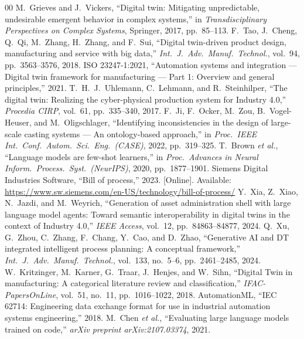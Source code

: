 \documentclass[conference]{IEEEtran}
\begin{document}

\begin{thebibliography}{00}
 M.~Grieves and J.~Vickers, ``Digital twin: Mitigating unpredictable, undesirable emergent behavior in complex systems,'' in \textit{Transdisciplinary Perspectives on Complex Systems}, Springer, 2017, pp.~85--113.
 F.~Tao, J.~Cheng, Q.~Qi, M.~Zhang, H.~Zhang, and F.~Sui, ``Digital twin-driven product design, manufacturing and service with big data,'' \textit{Int.\ J.\ Adv.\ Manuf.\ Technol.}, vol.~94, pp.~3563--3576, 2018.
 ISO 23247-1:2021, ``Automation systems and integration --- Digital twin framework for manufacturing --- Part 1: Overview and general principles,'' 2021.
 T.~H.~J.~Uhlemann, C.~Lehmann, and R.~Steinhilper, ``The digital twin: Realizing the cyber-physical production system for Industry 4.0,'' \textit{Procedia CIRP}, vol.~61, pp.~335--340, 2017.
 F.~Ji, F.~Ocker, M.~Zou, B.~Vogel-Heuser, and M.~Oligschlager, ``Identifying inconsistencies in the design of large-scale casting systems --- An ontology-based approach,'' in \textit{Proc.\ IEEE Int.\ Conf.\ Autom.\ Sci.\ Eng.\ (CASE)}, 2022, pp.~319--325.
 T.~Brown \textit{et al.}, ``Language models are few-shot learners,'' in \textit{Proc.\ Advances in Neural Inform.\ Process.\ Syst.\ (NeurIPS)}, 2020, pp.~1877--1901.
 Siemens Digital Industries Software, ``Bill of process,'' 2023. [Online]. Available: \url{https://www.sw.siemens.com/en-US/technology/bill-of-process/}
 Y.~Xia, Z.~Xiao, N.~Jazdi, and M.~Weyrich, ``Generation of asset administration shell with large language model agents: Toward semantic interoperability in digital twins in the context of Industry 4.0,'' \textit{IEEE Access}, vol.~12, pp.~84863--84877, 2024.
 Q.~Xu, G.~Zhou, C.~Zhang, F.~Chang, Y.~Cao, and D.~Zhao, ``Generative AI and DT integrated intelligent process planning: A conceptual framework,'' \textit{Int.\ J.\ Adv.\ Manuf.\ Technol.}, vol.~133, no.~5--6, pp.~2461--2485, 2024.
 W.~Kritzinger, M.~Karner, G.~Traar, J.~Henjes, and W.~Sihn, ``Digital Twin in manufacturing: A categorical literature review and classification,'' \textit{IFAC-PapersOnLine}, vol.~51, no.~11, pp.~1016--1022, 2018.
 AutomationML, ``IEC 62714: Engineering data exchange format for use in industrial automation systems engineering,'' 2018.
 M.~Chen \textit{et al.}, ``Evaluating large language models trained on code,'' \textit{arXiv preprint arXiv:2107.03374}, 2021.

\end{thebibliography}
\end{document}
